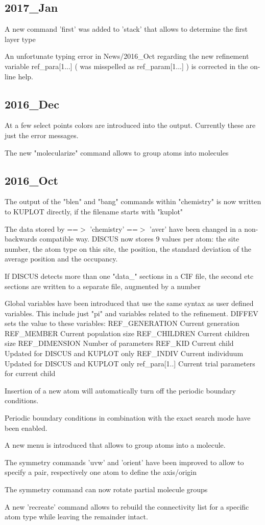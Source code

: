 \subsection*{2017\_Jan}
\par
A new command 'first' was added to 'stack' that allows to determine 
the first layer type 
\par
An unfortunate typing error in News/2016\_Oct regarding the new 
refinement variable 
ref\_para[1...]   ( was misspelled as ref\_param[1...] ) 
is corrected in the  on-line help. 
\subsection*{2016\_Dec}
\par
At a few select points colors are introduced into the output. 
Currently these are just the error messages. 
\par
The new "molecularize" command allows to group atoms into molecules 
\subsection*{2016\_Oct}
\par
The output of the "blen" and "bang" commands within "chemistry" 
is now written to KUPLOT directly, if the filename starts with 
"kuplot" 
\par
The data stored by ==$> $ 'chemistry' ==$> $ 'aver' have been changed in 
a non-backwards compatible way. DISCUS now stores 9 values per 
atom: 
the site number, the atom type on this site, the position, 
the standard deviation of the average position and the occupancy. 
\par
If DISCUS detects more than one "data\_" sections in a CIF file, 
the second etc sections are written to a separate file, augmented by 
a number 
\par
Global variables have been introduced that use the same syntax as 
user defined variables. This include just "pi" and variables related 
to the refinement. 
DIFFEV sets the value to these variables: 
REF\_GENERATION  Current generation 
REF\_MEMBER      Current population size 
REF\_CHILDREN    Current children size 
REF\_DIMENSION   Number of parameters 
REF\_KID         Current child Updated for DISCUS and KUPLOT only 
REF\_INDIV       Current individuum Updated for DISCUS and KUPLOT only 
ref\_para[1..]   Current trial parameters for current child 
\par
Insertion of a new atom will automatically turn off the periodic 
boundary conditions. 
\par
Periodic boundary conditions in combination with the exact search mode 
have been enabled. 
\par
A new menu is introduced that allows to group atoms into a molecule. 
\par
The symmetry commands 'uvw' and 'orient' have been improved to allow 
to specify a pair, respectively one atom to define the axis/origin 
\par
The symmetry command can now rotate partial molecule groups 
\par
A new 'recreate' command allows to rebuild the connectivity list 
for a specific atom type while leaving the remainder intact. 
